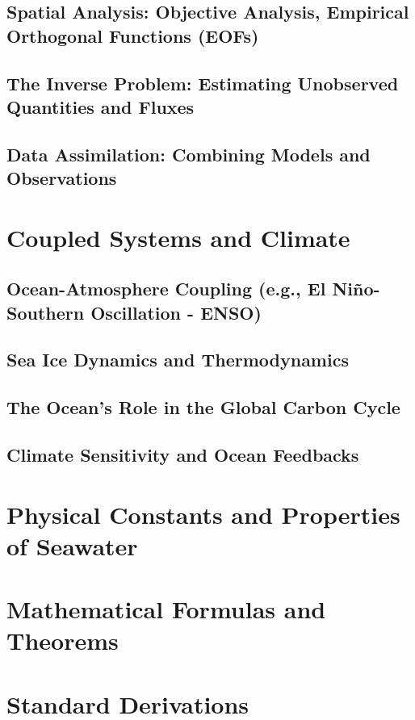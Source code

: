 \documentclass[12pt]{book}
\begin{document}
\section{Spatial Analysis: Objective Analysis, Empirical Orthogonal Functions (EOFs)}
\section{The Inverse Problem: Estimating Unobserved Quantities and Fluxes}
\section{Data Assimilation: Combining Models and Observations}

\chapter{Coupled Systems and Climate}
\section{Ocean-Atmosphere Coupling (e.g., El Niño-Southern Oscillation - ENSO)}
\section{Sea Ice Dynamics and Thermodynamics}
\section{The Ocean's Role in the Global Carbon Cycle}
\section{Climate Sensitivity and Ocean Feedbacks}

\begin{appendix}
\chapter{Physical Constants and Properties of Seawater}
\chapter{Mathematical Formulas and Theorems}
\chapter{Standard Derivations}
\end{appendix}
\end{document}
